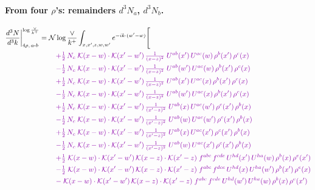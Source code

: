 \documentclass[10pt]{article}
\numberwithin{equation}{section}
\newcommand{\NNv}{\mathcal N\log\frac{\vee}{k^+}}
\begin{document}
\paragraph{From four $\rho$'s: remainders $d^3N_a$, $d^3N_b$.}
\begin{align}
\frac{d^3N}{d^3k}\bigg|^{\log\frac{\vee}{k^+}}_{4\rho,\,a\text{-}b}={}&\NNv\int_{x,x',z,w,w'}e^{-ik\cdot(w'-w)}\Bigg[\notag\\
&\quad{\color{CC}+\tfrac{1}{2}\,N_c\;\mathcal{K}(x-w)\cdot\mathcal{K}(x'-w')\,\tfrac{1}{(x-z)^{2}}\;U^{ab}(x')\,U^{ac}(w)\,\rho^{b}(x')\,\rho^{c}(x)}\notag\\
&\quad{\color{CC}-\tfrac{1}{2}\,N_c\;\mathcal{K}(x-w)\cdot\mathcal{K}(x'-w')\,\tfrac{1}{(x-z)^{2}}\;U^{ab}(w')\,U^{ac}(w)\,\rho^{b}(x')\,\rho^{c}(x)}\notag\\
&\quad{\color{CC}+\tfrac{1}{2}\,N_c\;\mathcal{K}(x-w)\cdot\mathcal{K}(x'-w')\,\tfrac{1}{(x-z)^{2}}\;U^{ab}(x')\,U^{ac}(x)\,\rho^{b}(x')\,\rho^{c}(x)}\notag\\
&\quad{\color{CC}-\tfrac{1}{2}\,N_c\;\mathcal{K}(x-w)\cdot\mathcal{K}(x'-w')\,\tfrac{1}{(x-z)^{2}}\;U^{ab}(w')\,U^{ac}(x)\,\rho^{b}(x')\,\rho^{c}(x)}\notag\\
&\quad{\color{CC}+\tfrac{1}{2}\,N_c\;\mathcal{K}(x-w)\cdot\mathcal{K}(x'-w')\,\tfrac{1}{(x'-z)^{2}}\;U^{ab}(x)\,U^{ac}(w')\,\rho^{c}(x')\,\rho^{b}(x)}\notag\\
&\quad{\color{CC}-\tfrac{1}{2}\,N_c\;\mathcal{K}(x-w)\cdot\mathcal{K}(x'-w')\,\tfrac{1}{(x'-z)^{2}}\;U^{ab}(w)\,U^{ac}(w')\,\rho^{c}(x')\,\rho^{b}(x)}\notag\\
&\quad{\color{CC}+\tfrac{1}{2}\,N_c\;\mathcal{K}(x-w)\cdot\mathcal{K}(x'-w')\,\tfrac{1}{(x'-z)^{2}}\;U^{ab}(x)\,U^{ac}(x')\,\rho^{c}(x')\,\rho^{b}(x)}\notag\\
&\quad{\color{CC}-\tfrac{1}{2}\,N_c\;\mathcal{K}(x-w)\cdot\mathcal{K}(x'-w')\,\tfrac{1}{(x'-z)^{2}}\;U^{ab}(w)\,U^{ac}(x')\,\rho^{c}(x')\,\rho^{b}(x)}\notag\\
&\quad{\color{CC}+\tfrac{1}{2}\;\mathcal{K}(x-w)\cdot\mathcal{K}(x'-w')\,\mathcal{K}(x-z)\cdot\mathcal{K}(x'-z)\;f^{abc}\,f^{cde}\,U^{hd}(x')\,U^{ha}(w)\,\rho^{b}(x)\,\rho^{e}(x')}\notag\\
&\quad{\color{CC}-\tfrac{1}{2}\;\mathcal{K}(x-w)\cdot\mathcal{K}(x'-w')\,\mathcal{K}(x-z)\cdot\mathcal{K}(x'-z)\;f^{abc}\,f^{dce}\,U^{hd}(x)\,U^{ha}(w')\,\rho^{b}(x')\,\rho^{e}(x)}\notag\\
&\quad{\color{CC}-\;\mathcal{K}(x-w)\cdot\mathcal{K}(x'-w')\,\mathcal{K}(x-z)\cdot\mathcal{K}(x'-z)\;f^{abc}\,f^{cde}\,U^{hd}(w')\,U^{ha}(w)\,\rho^{b}(x)\,\rho^{e}(x')}\notag\\

\end{align}
\end{document}
